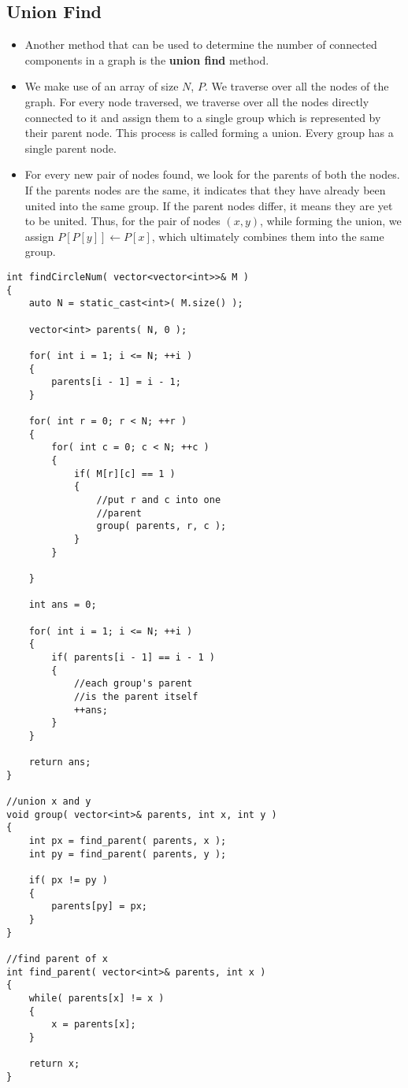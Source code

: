 \subsection{Union Find}
\begin{itemize}
\item Another method that can be used to determine the number of connected components in a graph is the \textbf{union find} method.
\item We make use of an array of size $N$, $P$. We traverse over all the nodes of the graph. For every node traversed, we traverse over all the nodes directly connected to it and assign them to a single group which is represented by their parent node. This process is called forming a union. Every group has a single parent node.
\item For every new pair of nodes found, we look for the parents of both the nodes. If the parents nodes are the same, it indicates that they have already been united into the same group. If the parent nodes differ, it means they are yet to be united. Thus, for the pair of nodes $ (x, y) $, while forming the union, we assign $P[P[y]] \gets P[x]$, which ultimately combines them into the same group.
\end{itemize}

\setcounter{lstlisting}{0}
\begin{lstlisting}[style=customc, caption={Union Find}]
int findCircleNum( vector<vector<int>>& M )
{
    auto N = static_cast<int>( M.size() );

    vector<int> parents( N, 0 );

    for( int i = 1; i <= N; ++i )
    {
        parents[i - 1] = i - 1;
    }

    for( int r = 0; r < N; ++r )
    {
        for( int c = 0; c < N; ++c )
        {
            if( M[r][c] == 1 )
            {
                //put r and c into one
                //parent
                group( parents, r, c );
            }
        }

    }

    int ans = 0;

    for( int i = 1; i <= N; ++i )
    {
        if( parents[i - 1] == i - 1 )
        {
            //each group's parent
            //is the parent itself
            ++ans;
        }
    }

    return ans;
}

//union x and y
void group( vector<int>& parents, int x, int y )
{
    int px = find_parent( parents, x );
    int py = find_parent( parents, y );

    if( px != py )
    {
        parents[py] = px;
    }
}

//find parent of x
int find_parent( vector<int>& parents, int x )
{
    while( parents[x] != x )
    {
        x = parents[x];
    }

    return x;
}
\end{lstlisting}